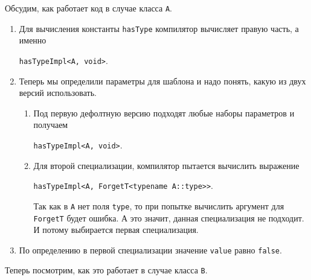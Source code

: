Обсудим, как работает код в случае класса \verb"A".
\begin{enumerate}
\item Для вычисления константы \verb"hasType" компилятор вычисляет правую часть, а именно
\begin{center}
\verb"hasTypeImpl<A, void>".
\end{center}

\item Теперь мы определили параметры для шаблона и надо понять, какую из двух версий использовать.
\begin{enumerate}
\item Под первую дефолтную версию подходят любые наборы параметров и получаем
\begin{center}
\verb"hasTypeImpl<A, void>".
\end{center}

\item Для второй специализации, компилятор пытается вычислить выражение
\begin{center}
\verb"hasTypeImpl<A, ForgetT<typename A::type>>".
\end{center}
Так как в \verb"A" нет поля \verb"type", то при попытке вычислить аргумент для \verb"ForgetT" будет ошибка.
А это значит, данная специализация не подходит.
И потому выбирается первая специализация.
\end{enumerate}

\item По определению в первой специализации значение \verb"value" равно \verb"false".
\end{enumerate}
Теперь посмотрим, как это работает в случае класса \verb"B".
